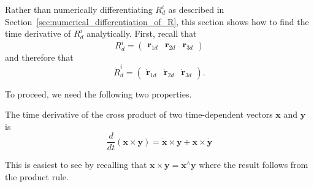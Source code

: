 %
%
%
%
%
%
%
%
%
%

Rather than numerically differentiating $R_d^i$ as described in Section~\ref{sec:numerical_differentiation_of_R}, this section shows how to find the time derivative of $R_d^i$ analytically.
First, recall that
\begin{equation}
	R_d^i = \begin{pmatrix} \mathbf{r}_{1d} & \mathbf{r}_{2d}&  \mathbf{r}_{3d} \end{pmatrix}
\end{equation}
and therefore that
\begin{equation}
	\dot{R}_d^i = \begin{pmatrix} \dot{\mathbf{r}}_{1d} & \dot{\mathbf{r}}_{2d} & \dot{\mathbf{r}}_{3d} \end{pmatrix}.
\end{equation}

To proceed, we need the following two properties.
\begin{property}
	The time derivative of the cross product of two time-dependent vectors $\mathbf{x}$ and $\mathbf{y}$ is
	\begin{equation}
		\label{eq:cross_derivative}
		\frac{d}{dt} (\mathbf{x} \times \mathbf{y}) = \dot{\mathbf{x}} \times \mathbf{y} + \mathbf{x} \times \dot{\mathbf{y}}
	\end{equation}
\end{property}
\proof
This is easiest to see by recalling that $\mathbf{x} \times \mathbf{y} = \mathbf{x}^\wedge \mathbf{y}$ where the result follows from the product rule.
\endproof

